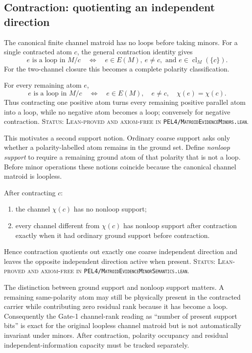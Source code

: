 \subsection{Contraction: quotienting an independent direction}

The canonical finite channel matroid has no loops before taking minors. For a
single contracted atom \(c\), the general contraction identity gives
\[
  e\text{ is a loop in }M/c
  \quad\Longleftrightarrow\quad
  e\in E(M),\ e\neq c,
  \text{ and }e\in\operatorname{cl}_M(\{c\}).
\]
For the two-channel closure this becomes a complete polarity classification.

\begin{theorem}
For every remaining atom \(e\),
\[
  e\text{ is a loop in }M/c
  \quad\Longleftrightarrow\quad
  e\in E(M),\quad e\neq c,\quad \chi(e)=\chi(c).
\]
Thus contracting one positive atom turns every remaining positive parallel atom
into a loop, while no negative atom becomes a loop; conversely for negative
contraction.
\textup{\textsc{Status: Lean-proved and axiom-free in
\texttt{PEL4/MatroidEvidenceMinors.lean}.}}
\end{theorem}

This motivates a second support notion. Ordinary coarse support asks only whether
a polarity-labelled atom remains in the ground set. Define \emph{nonloop support}
to require a remaining ground atom of that polarity that is not a loop. Before
minor operations these notions coincide because the canonical channel matroid is
loopless.

\begin{proposition}
After contracting \(c\):
\begin{enumerate}[label=(\roman*)]
  \item the channel \(\chi(c)\) has no nonloop support;
  \item every channel different from \(\chi(c)\) has nonloop support after
  contraction exactly when it had ordinary ground support before contraction.
\end{enumerate}
Hence contraction quotients out exactly one coarse independent direction and leaves
the opposite independent direction active when present.
\textup{\textsc{Status: Lean-proved and axiom-free in
\texttt{PEL4/MatroidEvidenceMinorSemantics.lean}.}}
\end{proposition}

The distinction between ground support and nonloop support matters. A remaining
same-polarity atom may still be physically present in the contracted carrier while
contributing zero residual rank because it has become a loop. Consequently the
Gate-1 channel-rank reading as ``number of present support bits'' is exact for the
original loopless channel matroid but is not automatically invariant under minors.
After contraction, polarity occupancy and residual independent-information capacity
must be tracked separately.

